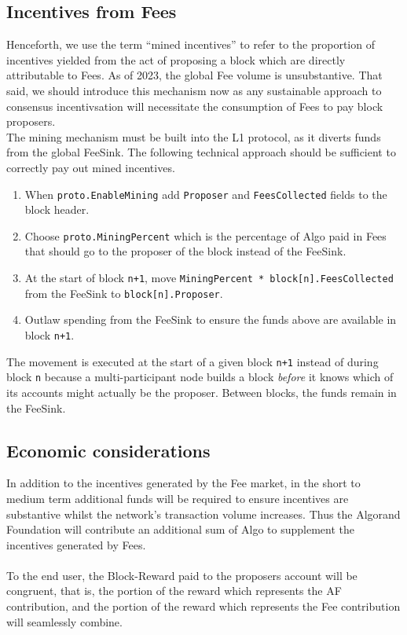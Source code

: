 \documentclass[11pt,a4paper]{article}
\begin{document}
\subsection{Incentives from Fees}
Henceforth, we use the term “mined incentives” to refer to the proportion of incentives yielded from the act of 
proposing a block which are directly attributable to Fees. As of 2023, the global Fee volume is unsubstantive. That 
said, we should introduce this mechanism now as any sustainable approach to consensus incentivsation will necessitate 
the consumption of Fees to pay block proposers. \\

The mining mechanism must be built into the L1 protocol, as it diverts funds from the global \gls{FeeSink}. The 
following technical approach should be sufficient to correctly pay out mined incentives.

\begin{enumerate}
    \item When \texttt{proto.EnableMining} add \texttt{Proposer} and \texttt{FeesCollected} fields to the block header.
    \item Choose \texttt{proto.MiningPercent} which is the percentage of Algo paid in Fees that should go to the 
          proposer of the block instead of the \gls{FeeSink}.
    \item At the start of block \texttt{n+1}, move \texttt{MiningPercent * block[n].FeesCollected} from the 
          \gls{FeeSink} to \texttt{block[n].Proposer}.
    \item Outlaw spending from the \gls{FeeSink} to ensure the funds above are available in block \texttt{n+1}.

\end{enumerate}

The movement is executed at the start of a given block \texttt{n+1} instead of during block \texttt{n} because a 
multi-participant node builds a block \textit{before} it knows which of its accounts might actually be the
proposer. Between blocks, the funds remain in the \gls{FeeSink}.

\subsection{Economic considerations} \label{subsec:eco}
In addition to the incentives generated by the Fee market, in the short to medium term additional funds will be required
to ensure incentives are substantive whilst the network's transaction volume increases. Thus the Algorand Foundation 
will contribute an additional sum of Algo to supplement the incentives generated by Fees. \\ \\
To the end user, the \gls{Block-Reward} paid to the proposers account will be congruent, that is, the portion of the
reward which represents the AF contribution, and the portion of the reward which represents the Fee contribution will
seamlessly combine.
\end{document}
